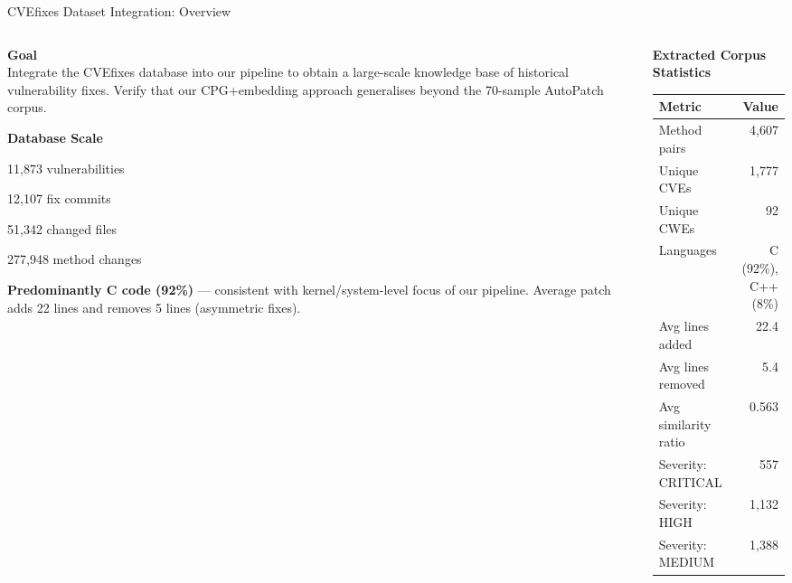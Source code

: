 \documentclass[aspectratio=169,10pt]{beamer}
\begin{document}
\begin{frame}{CVEfixes Dataset Integration: Overview}
\begin{columns}[T]
\begin{column}{0.50\textwidth}

  \textbf{Goal}\\[3pt]
  {\small Integrate the CVEfixes database into our pipeline to
  obtain a large-scale knowledge base of historical vulnerability fixes.
  Verify that our CPG+embedding approach generalises beyond the 70-sample AutoPatch corpus.}

  \vspace{0.6em}
  \textbf{Database Scale}
  \begin{description}
    \item[\textbf{CVEs}] 11,873 vulnerabilities
    \item[\textbf{commits}] 12,107 fix commits
    \item[\textbf{files}] 51,342 changed files
    \item[\textbf{methods}] 277,948 method changes
  \end{description}

      \textbf{Predominantly C code (92\%)} — consistent with kernel/system-level focus of our pipeline.
      Average patch adds 22 lines and removes 5 lines (asymmetric fixes).
\end{column}
\begin{column}{0.47\textwidth}

  \centering
  \vspace{0.5em}
  {\small\textbf{Extracted Corpus Statistics}}\\[6pt]
  {\scriptsize
  \renewcommand{\arraystretch}{1.25}
  \begin{tabular}{lr}
    \toprule
    \textbf{Metric} & \textbf{Value} \\
    \midrule
    Method pairs & 4,607 \\
    Unique CVEs & 1,777 \\
    Unique CWEs & 92 \\
    Languages & C (92\%), C++ (8\%) \\
    \midrule
    Avg lines added & 22.4 \\
    Avg lines removed & 5.4 \\
    Avg similarity ratio & 0.563 \\
    \midrule
    Severity: CRITICAL & 557 \\
    Severity: HIGH & 1,132 \\
    Severity: MEDIUM & 1,388 \\
    \bottomrule
  \end{tabular}}

\end{column}
\end{columns}
\end{frame}
\end{document}
